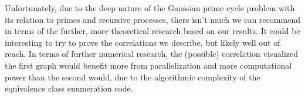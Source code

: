 \documentclass{article}
\begin{document}
Unfortunately, due to the deep nature of the Gaussian prime cycle problem with its relation to primes and recursive processes, there isn't much we can recommend in terms of the further, more theoretical research based on our results. It could be interesting to try to prove the correlations we describe, but likely well out of reach. In terms of further numerical research, the (possible) correlation visualized the first graph would benefit more from parallelization and more computational power than the second would, due to the algorithmic complexity of the equivalence class enumeration code.



\end{document}

